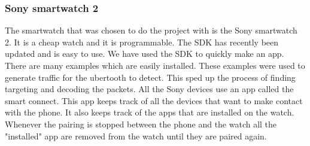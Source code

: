 \subsubsection{Sony smartwatch 2}
\label{subsubsec:sw2}
The smartwatch that was chosen to do the project with is the Sony smartwatch 2. It is a cheap watch and it is programmable. The SDK has recently been updated and is easy to use. We have used the SDK to quickly make an app. There are many examples which are easily installed. These examples were used to generate traffic for the ubertooth to detect. This sped up the process of finding targeting and decoding the packets. All the Sony devices use an app called the smart connect. This app keeps track of all the devices that want to make contact with the phone. It also keeps track of the apps that are installed on the watch. Whenever the pairing is stopped between the phone and the watch all the "installed" app are removed from the watch until they are paired again.
